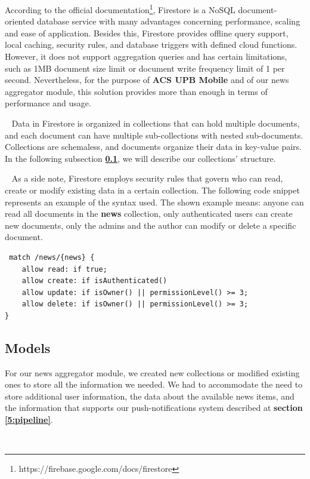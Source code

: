 According to the official documentation\footnote{https://firebase.google.com/docs/firestore}, Firestore is a NoSQL document-oriented database service with many advantages concerning performance, scaling and ease of application. Besides this, Firestore provides offline query support, local caching, security rules, and database triggers with defined cloud functions. However, it does not support aggregation queries and has certain limitations, such as 1MB document size limit or document write frequency limit of 1 per second. Nevertheless, for the purpose of \textbf{ACS UPB Mobile} and of our news aggregator module, this solution provides more than enough in terms of performance and usage. 

~
Data in Firestore is organized in collections that can hold multiple documents, and each document can have multiple sub-collections with nested sub-documents. Collections are schemaless, and documents organize their data in key-value pairs. In the following subsection \textbf{\ref{5:models}}, we will describe our collections' structure.

~
As a side note, Firestore employs security rules that govern who can read, create or modify existing data in a certain collection. The following code snippet represents an example of the syntax used. The shown example means: anyone can read all documents in the \textbf{news} collection, only authenticated users can create new documents, only the admins and the author can modify or delete a specific document. 

\begin{verbatim}
 match /news/{news} {
    allow read: if true;
    allow create: if isAuthenticated()
    allow update: if isOwner() || permissionLevel() >= 3;
    allow delete: if isOwner() || permissionLevel() >= 3;
}
\end{verbatim}

\subsection{Models} \label{5:models}

For our news aggregator module, we created new collections or modified existing ones to store all the information we needed. We had to accommodate the need to store additional user information, the data about the available news items, and the information that supports our push-notifications system described at \textbf{section \ref{5:pipeline}}.

~

